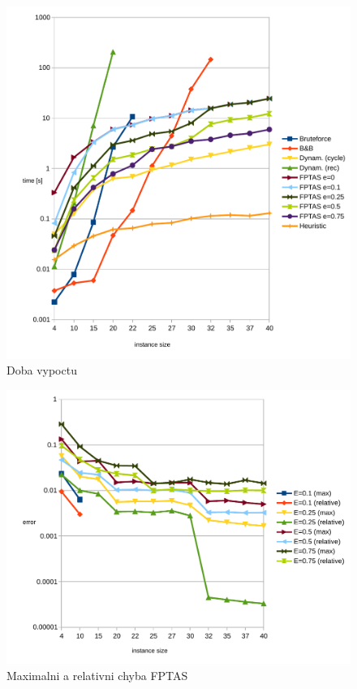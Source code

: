 \documentclass[12pt,a4paper]{article}
\begin{document}
\begin{figure}[H]
	\caption{Doba vypoctu}
 	\centerline{\includegraphics{./time_svg.pdf}}
\end{figure}

\begin{figure}[H]
	\caption{Maximalni a relativni chyba FPTAS}
 	\centerline{\includegraphics{./fptas_err.pdf}}
\end{figure}
\end{document}
